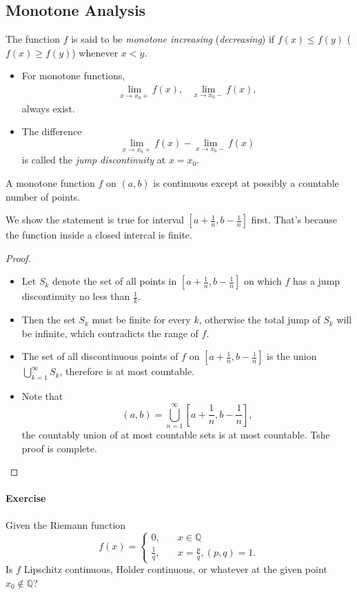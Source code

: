 \subsection{Monotone Analysis}
\begin{definition}[Monotone]
The function $f$ is said to be \emph{monotone increasing} (\emph{decreasing}) if $f(x)\le f(y)$ ($f(x)\ge f(y)$) whenever $x<y$.
\end{definition}
\begin{remark}
\begin{itemize}
\item
For monotone functions,
\[
\begin{array}{ll}
\lim_{x\to x_0+}f(x),
&
\lim_{x\to x_0-}f(x),
\end{array}
\]
always exist.
\item
The difference 
\[
\lim_{x\to x_0+}f(x)-\lim_{x\to x_0-}f(x)
\]
is called the \emph{jump discontinuity} at $x=x_0$.
\end{itemize}
\end{remark}
\begin{proposition}
A monotone function $f$ on $(a,b)$ is continuous except at possibly a countable number of points.
\end{proposition}
We show the statement is true for interval $[a+\frac{1}{n},b-\frac{1}{n}]$ first. That's because the function inside a closed intercal is finite.
\begin{proof}
\begin{itemize}
\item
Let $S_k$ denote the set of all points in $[a+\frac{1}{n},b-\frac{1}{n}]$ on which $f$ has a jump discontinuity no less than $\frac{1}{k}$.
\item
Then the set $S_k$ must be finite for every $k$, otherwise the total jump of $S_k$ will be infinite, which contradicts the range of $f$.
\item
The set of all discontinuous points of $f$ on $[a+\frac{1}{n},b-\frac{1}{n}]$ is the union $\bigcup_{k=1}^\infty S_k$, therefore is at most countable.
\item
Note that 
\[
(a,b)=\bigcup_{n=1}^\infty[a+\frac{1}{n},b-\frac{1}{n}],
\]
the countably union of at most countable sets is at most countable. Tshe proof is complete.
\end{itemize}
\end{proof}
\paragraph{Exercise} Given the Riemann function 
\[
f(x)=\left\{
\begin{aligned}
0,&\quad x\in\mathbb{Q}\\
\frac{1}{q},&\quad x=\frac{p}{q}, (p,q)=1.
\end{aligned}
\right.
\]
Is $f$ Lipschitz continuous, Holder continuous, or whatever at the given point $x_0\notin\mathbb{Q}$?

